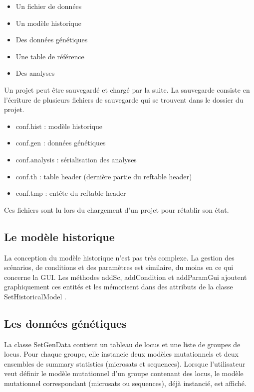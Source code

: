 \documentclass[12pt,a4paper]{article}
\begin{document}
        \begin{itemize}
            \item Un fichier de données
            \item Un modèle historique
            \item Des données génétiques
            \item Une table de référence
            \item Des analyses\\
        \end{itemize}

        Un projet peut être sauvegardé et chargé par la suite. La sauvegarde
        consiste en l'écriture de plusieurs fichiers de sauvegarde qui se
        trouvent dans le dossier du projet.\\

        \begin{itemize}
            \item conf.hist : modèle historique
            \item conf.gen : données génétiques
            \item conf.analysis : sérialisation des analyses
            \item conf.th : table header (dernière partie du reftable header)
            \item conf.tmp : entête du reftable header\\
        \end{itemize}

        Ces fichiers sont lu lors du chargement d'un projet pour rétablir son état.

    \subsection{Le modèle historique}
        La conception du modèle historique n'est pas très complexe. La gestion
        des scénarios, de conditions et des paramètres est similaire, du moins
        en ce qui concerne la GUI. Les méthodes addSc, addCondition et
        addParamGui ajoutent graphiquement ces entités et les mémorisent dans
        des attributs de la classe SetHistoricalModel .

    \subsection{Les données génétiques}
        La classe SetGenData contient un tableau de locus et une liste de
        groupes de locus. Pour chaque groupe, elle instancie deux modèles
        mutationnels et deux ensembles de summary statistics (microsats et
        sequences). Lorsque l'utilisateur veut définir le modèle mutationnel
        d'un groupe contenant des locus, le modèle mutationnel correspondant
        (microsats ou sequences), déjà instancié, est affiché.
\end{document}
